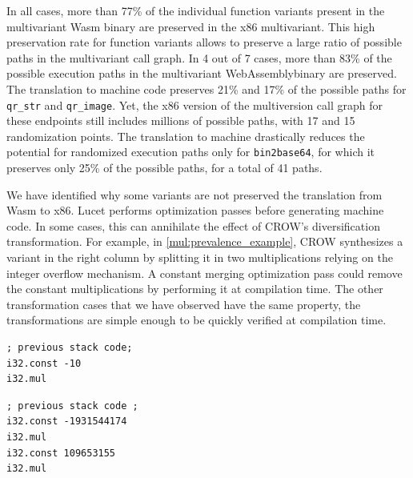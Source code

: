  
In all cases, more than 77\% of the individual function variants present in the multivariant Wasm  binary are preserved in the x86 multivariant. This high preservation rate for function variants allows to preserve a large ratio of possible paths in the multivariant call graph.
In 4 out of 7 cases, more than 83\% of the possible execution paths in the multivariant WebAssemblybinary are preserved.
The translation to machine code preserves 21\% and 17\% of the possible paths for \texttt{qr\_str} and \texttt{qr\_image}. Yet, the x86 version of the multiversion call graph for these endpoints still includes millions of possible paths, with 17 and 15 randomization points. The translation to machine drastically reduces the potential for randomized execution paths only for \texttt{bin2base64}, for which it preserves only 25\% of the possible paths, for a total of 41 paths.

We have identified why some variants are not preserved the translation from Wasm  to x86. Lucet performs optimization passes before generating machine code. 
In some cases, this can annihilate the effect of CROW's diversification transformation. 
For example, in \autoref{mul:prevalence_example}, CROW synthesizes a variant in the right column by splitting it in two  multiplications relying on the integer overflow mechanism. 
A  constant merging optimization pass could remove the constant multiplications by performing it at compilation time. 
The other transformation cases that we have observed have the same property, the transformations are simple enough to be quickly verified at compilation time.

\lstset{
    language=WAT,
    style=WATStyle,
    stepnumber=0,
    label=EQExample}
\begin{code}
\noindent\begin{minipage}[b]{0.9\linewidth}
    
    \begin{minipage}[t]{0.45\linewidth}
        \begin{lstlisting}
; previous stack code;
i32.const -10
i32.mul
        \end{lstlisting}
    \end{minipage}%
    \hfill\noindent\begin{minipage}[t]{0.45\linewidth}
       
        \begin{lstlisting}
; previous stack code ;
i32.const -1931544174
i32.mul
i32.const 109653155
i32.mul
        \end{lstlisting}
    \end{minipage}
    
    \label{mul:prevalence_example}
\end{minipage}
\end{code}





